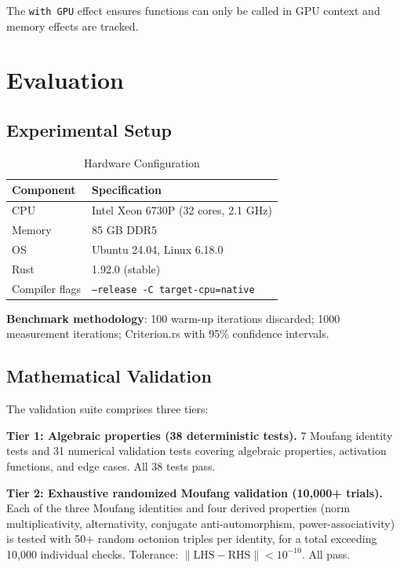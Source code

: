 \documentclass[11pt,a4paper]{article}
\begin{document}
The \texttt{with GPU} effect ensures functions can only be called in GPU context and memory effects are tracked.

\section{Evaluation}
\label{sec:evaluation}

\subsection{Experimental Setup}

\begin{table}[h]
\centering
\caption{Hardware Configuration}
\label{tab:hardware}
\begin{tabular}{@{}ll@{}}
\toprule
Component & Specification \\
\midrule
CPU & Intel Xeon 6730P (32 cores, 2.1 GHz) \\
Memory & 85 GB DDR5 \\
OS & Ubuntu 24.04, Linux 6.18.0 \\
Rust & 1.92.0 (stable) \\
Compiler flags & \texttt{--release -C target-cpu=native} \\
\bottomrule
\end{tabular}
\end{table}

\textbf{Benchmark methodology}: 100 warm-up iterations discarded; 1000 measurement iterations; Criterion.rs with 95\% confidence intervals.

\subsection{Mathematical Validation}

The validation suite comprises three tiers:

\textbf{Tier 1: Algebraic properties (38 deterministic tests).} 7 Moufang identity tests and 31 numerical validation tests covering algebraic properties, activation functions, and edge cases. All 38 tests pass.

\textbf{Tier 2: Exhaustive randomized Moufang validation (10{,}000+ trials).} Each of the three Moufang identities and four derived properties (norm multiplicativity, alternativity, conjugate anti-automorphism, power-associativity) is tested with 50+ random octonion triples per identity, for a total exceeding 10{,}000 individual checks. Tolerance: $\lVert \text{LHS} - \text{RHS} \rVert < 10^{-10}$. All pass.
\end{document}
